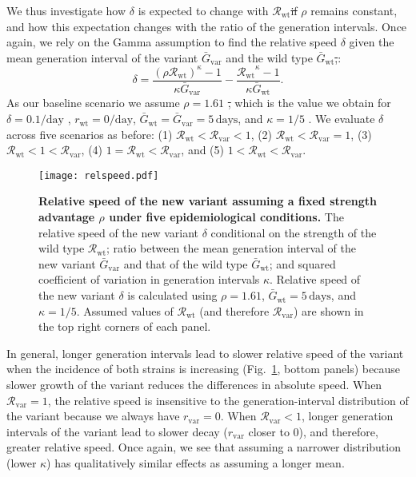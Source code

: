 \documentclass[12pt]{article}
\newcommand{\fref}[1]{Fig.~\ref{fig:#1}}
\newcommand{\vvvar}{\mathrm{var}}
\newcommand{\wwwt}{\mathrm{wt}}
\newcommand{\rx}[1]{\ensuremath{{r}_{#1}}\xspace}
\newcommand{\rw}{\rx{\wwwt}}
\newcommand{\rv}{\rx{\vvvar}}
\newcommand{\Rx}[1]{\ensuremath{{\mathcal R}_{#1}}\xspace}
\newcommand{\Rw}{\Rx{\wwwt}}
\newcommand{\Rv}{\Rx{\vvvar}}
\newcommand{\days}{\ensuremath{\, \textrm{days}}}
\newcommand{\pday}{\ensuremath{/\textrm{day}}}
\newcommand{\Gx}[1]{\ensuremath{{\bar G}_{#1}}\xspace}
\newcommand{\Gw}{\Gx{\wwwt}}
\newcommand{\Gv}{\Gx{\vvvar}}
\providecommand{\DIFaddtex}[1]{{\protect\color{blue}\uwave{#1}}} %
\providecommand{\DIFdeltex}[1]{{\protect\color{red}\sout{#1}}}                      %
\providecommand{\DIFaddbegin}{} %
\providecommand{\DIFaddend}{} %
\providecommand{\DIFdelbegin}{} %
\providecommand{\DIFdelend}{} %
\providecommand{\DIFadd}[1]{\texorpdfstring{\DIFaddtex{#1}}{#1}} %
\providecommand{\DIFdel}[1]{\texorpdfstring{\DIFdeltex{#1}}{}} %
\newcommand{\DIFscaledelfig}{0.5}
\newlength{\DIFdelgraphicswidth} %
\newlength{\DIFdelgraphicsheight} %
\newcommand{\DIFaddincludegraphics}[2][]{{\color{blue}\fbox{\DIFOincludegraphics[#1]{#2}}}} %
\newcommand{\DIFdelincludegraphics}[2][]{%
\sbox{\DIFdelgraphicsbox}{\DIFOincludegraphics[#1]{#2}}%
\settoboxwidth{\DIFdelgraphicswidth}{\DIFdelgraphicsbox} %
\settoboxtotalheight{\DIFdelgraphicsheight}{\DIFdelgraphicsbox} %
\scalebox{\DIFscaledelfig}{%
\parbox[b]{\DIFdelgraphicswidth}{\usebox{\DIFdelgraphicsbox}\\[-\baselineskip] \rule{\DIFdelgraphicswidth}{0em}}\llap{\resizebox{\DIFdelgraphicswidth}{\DIFdelgraphicsheight}{%
\setlength{\unitlength}{\DIFdelgraphicswidth}%
\begin{picture}(1,1)%
\thicklines\linethickness{2pt} %
{\color[rgb]{1,0,0}\put(0,0){\framebox(1,1){}}}%
{\color[rgb]{1,0,0}\put(0,0){\line( 1,1){1}}}%
{\color[rgb]{1,0,0}\put(0,1){\line(1,-1){1}}}%
\end{picture}%
}\hspace*{3pt}}} %
} %
\DeclareRobustCommand{\DIFaddbegin}{\DIFOaddbegin \let\includegraphics\DIFaddincludegraphics} %
\DeclareRobustCommand{\DIFaddend}{\DIFOaddend \let\includegraphics\DIFOincludegraphics} %
\DeclareRobustCommand{\DIFdelbegin}{\DIFOdelbegin \let\includegraphics\DIFdelincludegraphics} %
\DeclareRobustCommand{\DIFdelend}{\DIFOaddend \let\includegraphics\DIFOincludegraphics} %
\begin{document}
We thus investigate how $\delta$ is expected to change with \Rw \DIFdelbegin \DIFdel{if }\DIFdelend \DIFaddbegin \DIFadd{when }\DIFaddend $\rho$ remains constant, and how this expectation changes with the ratio of the generation intervals. 
Once again, we rely on the Gamma assumption \DIFaddbegin \DIFadd{\mbox{%
\citep{park2019practical} }\hspace{0pt}%
}\DIFaddend to find the relative speed $\delta$ given the mean generation interval of the variant $\Gv$ and the wild type $\Gw$\DIFdelbegin \DIFdel{,}\DIFdelend :
\begin{equation}
\delta = \frac{(\rho \Rw)^{\kappa} - 1}{\kappa \Gv} - \frac{\Rw^{\kappa} - 1}{\kappa \Gw}.
\end{equation}
As our baseline scenario we assume $\rho = 1.61$ \DIFdelbegin \DIFdel{, }\DIFdelend \DIFaddbegin \DIFadd{(and therefore, we always have $\Rw < \Rv$), }\DIFaddend which is the value we obtain for $\delta=0.1\pday$ \DIFaddbegin \DIFadd{\mbox{%
\citep{davies2021estimated}}\hspace{0pt}%
}\DIFaddend , $\rw=0\pday$, $\Gw = \Gv = 5\,\textrm{days}$, and $\kappa = 1/5$ \DIFaddbegin \DIFadd{\mbox{%
\citep{ferretti2020quantifying}}\hspace{0pt}%
}\DIFaddend .
We evaluate $\delta$ across five scenarios as before: (1) $\Rw < \Rv < 1$, (2) $\Rw < \Rv = 1$, (3) $\Rw < 1 < \Rv$, (4) $1 = \Rw < \Rv$, and (5) $1 < \Rw < \Rv$.

\begin{figure}[!th]
\texttt{[image: relspeed.pdf]}
\caption{
\textbf{Relative speed of the new variant assuming a fixed strength advantage $\rho$ under five epidemiological conditions.}
The relative speed of the new variant $\delta$ conditional on the strength of the wild type $\Rw$; ratio between the mean generation interval of the new variant $\Gv$ and that of the wild type $\Gw$; and squared coefficient of variation in generation intervals $\kappa$.
Relative speed of the new variant $\delta$ is calculated using $\rho=1.61$, $\Gw = 5\days$, and $\kappa = 1/5$.
Assumed values of $\Rw$ (and therefore $\Rv$) are shown in the top right corners of each panel.
}
\label{fig:relspeed}
\end{figure}

In general, longer generation intervals lead to slower relative speed of the variant when the incidence of both strains is increasing (\fref{relspeed}, bottom panels) because slower growth of the variant reduces the differences in absolute speed.
When $\Rv=1$, the relative speed is insensitive to the generation-interval distribution of the variant because we always have $\rv=0$.
When $\Rv<1$, longer generation intervals of the variant lead to slower decay ($\rv$ closer to 0), and therefore, greater relative speed.
Once again, we see that assuming a narrower distribution (lower $\kappa$) has qualitatively similar effects as assuming a longer mean.
\end{document}
